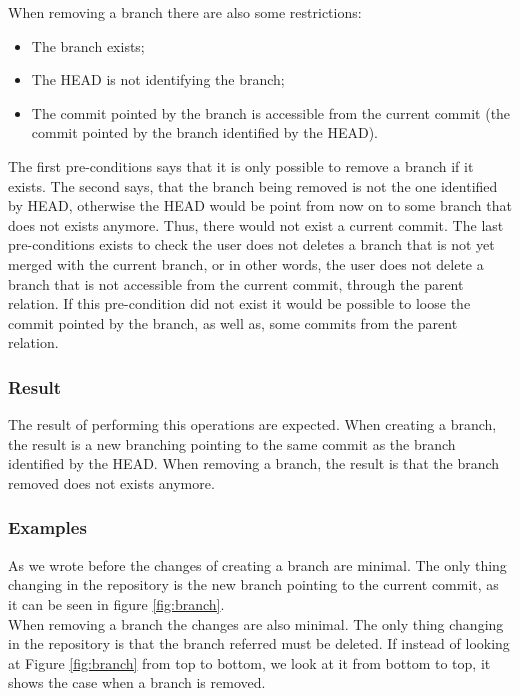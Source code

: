When removing a branch there are also some restrictions:
\begin{itemize}
   \item The branch exists;
   \item The HEAD is not identifying the branch;
   \item The commit pointed by the branch is accessible from the
   current commit (the commit pointed by the branch identified by the
   HEAD).
\end{itemize}

The first pre-conditions says that it is only possible to remove a
branch if it exists. The second says, that the branch being removed is
not the one identified by HEAD, otherwise the HEAD would be point from
now on to some branch that does not exists anymore. Thus, there would
not exist a current commit. The last pre-conditions exists to check
the user does not deletes a branch that is not yet merged with the
current branch, or in other words, the user does not delete a branch
that is not accessible from the current commit, through the parent relation. 
If this pre-condition did not exist it would be possible to loose the
commit pointed by the branch, as well as, some commits from the parent
relation.


\subsubsection{Result}
The result of performing this operations are expected. When creating a
branch, the result is a new branching pointing to the same commit as
the branch identified by the HEAD. When removing a branch, the result
is that the branch removed does not exists anymore.

\subsubsection{Examples}
As we wrote before the changes of creating a branch are minimal. The only thing
changing in the repository is the new branch pointing to the current commit, as
it can be seen in figure \ref{fig:branch}. \\

When removing a branch the changes are also minimal. The only thing
changing in the repository is that the 
branch referred must be deleted. If instead of looking at Figure
\ref{fig:branch} from top to bottom, we look at it from bottom to top,
it shows the case when a branch is removed. \\ 

